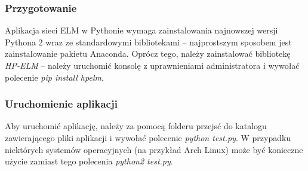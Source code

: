 \documentclass{article}
\begin{document}
\subsubsection*{Przygotowanie}
Aplikacja sieci ELM w Pythonie wymaga zainstalowania najnowszej wersji Pythona 2 wraz ze standardowymi bibliotekami -- najprostszym sposobem jest zainstalowanie pakietu Anaconda. Oprócz tego, należy zainstalować bibliotekę \textit{HP-ELM} -- należy uruchomić konsolę z uprawnieniami administratora i wywołać polecenie \textit{pip install hpelm}. 
\subsubsection*{Uruchomienie aplikacji}
Aby uruchomić aplikację, należy za pomocą folderu przejsć do katalogu zawierającego pliki aplikacji i wywołać polecenie \textit{python test.py}. W przypadku niektórych systemów operacyjnych (na przykład Arch Linux) może być konieczne użycie zamiast tego polecenia \textit{python2 test.py}.
\end{document}
